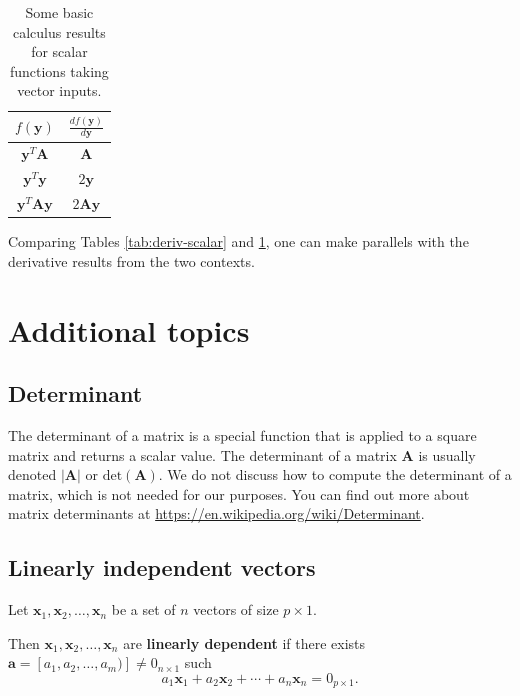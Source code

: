 \documentclass[
]{book}
\theoremstyle{definition}
\theoremstyle{definition}
\theoremstyle{definition}
\theoremstyle{definition}
\theoremstyle{remark}
\begin{document}
\begin{table}

\caption{\label{tab:deriv-vector}Some basic calculus results for scalar functions taking vector inputs.}
\centering
\begin{tabular}[t]{c|c}
\hline
$f(\mathbf{y})$ & $\frac{df(\mathbf{y})}{d\mathbf{y}}$\\
\hline
$\mathbf{y}^T \mathbf{A}$ & $\mathbf{A}$\\
\hline
$\mathbf{y}^T \mathbf{y}$ & $2\mathbf{y}$\\
\hline
$\mathbf{y}^T \mathbf{A} \mathbf{y}$ & $2\mathbf{A}\mathbf{y}$\\
\hline
\end{tabular}
\end{table}

Comparing Tables \ref{tab:deriv-scalar} and \ref{tab:deriv-vector}, one can make parallels with the derivative results from the two contexts.

\hypertarget{additional-topics}{%
\section{Additional topics}\label{additional-topics}}

\hypertarget{determinant}{%
\subsection{Determinant}\label{determinant}}

The determinant of a matrix is a special function that is applied to a square matrix and returns a scalar value. The determinant of a matrix \(\mathbf{A}\) is usually denoted \(|\mathbf{A}|\) or \(\mathrm{det}(\mathbf{A})\). We do not discuss how to compute the determinant of a matrix, which is not needed for our purposes. You can find out more about matrix determinants at \url{https://en.wikipedia.org/wiki/Determinant}.

\hypertarget{linearly-independent-vectors}{%
\subsection{Linearly independent vectors}\label{linearly-independent-vectors}}

Let \(\mathbf{x}_1, \mathbf{x}_2, \ldots, \mathbf{x}_n\) be a set of \(n\) vectors of size \(p\times 1\).

Then \(\mathbf{x}_1, \mathbf{x}_2, \ldots, \mathbf{x}_n\) are \textbf{linearly dependent} if there exists \(\mathbf{a}=[a_1, a_2, \ldots, a_m)]\neq 0_{n\times 1}\) such
\[
a_1 \mathbf{x}_1 + a_2 \mathbf{x}_2 + \cdots + a_n \mathbf{x}_n = 0_{p\times 1}.
\]
\end{document}
